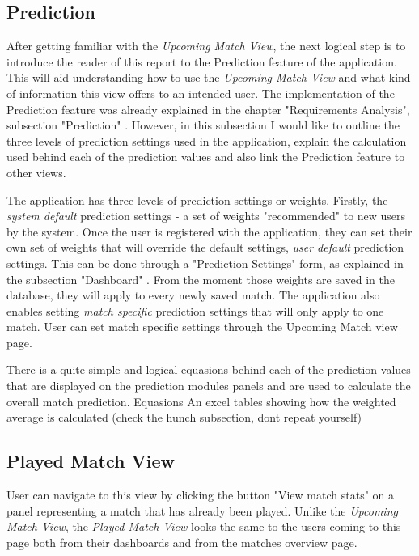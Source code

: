 \subsection{Prediction}
\label{subsec:predictionimplementation}
After getting familiar with the \emph{Upcoming Match View}, the next logical step is to introduce the reader of this report to the Prediction feature of the application. This will aid understanding how to use the \emph{Upcoming Match View} and what kind of information this view offers to an intended user. The implementation of the Prediction feature was already explained in the chapter "Requirements Analysis", subsection "Prediction" \cite{subsec:prediction_requirements}. However, in this subsection I would like to outline the three levels of prediction settings used in the application, explain the calculation used behind each of the prediction values and also link the Prediction feature to other views. 

The application has three levels of prediction settings or weights. Firstly, the \emph{system default} prediction settings - a set of weights "recommended" to new users by the system. Once the user is registered with the application, they can set their own set of weights that will override the default settings, \emph{user default} prediction settings. This can be done through a "Prediction Settings" form, as explained in the subsection "Dashboard" \cite{subsec:dashboard}. From the moment those weights are saved in the database, they will apply to every newly saved match. The application also enables setting \emph {match specific} prediction settings that will only apply to one match. User can set match specific settings through the Upcoming Match view page.

There is a quite simple and logical equasions behind each of the prediction values that are displayed on the prediction modules panels and are used to calculate the overall match prediction. 
Equasions
An excel tables showing how the weighted average is calculated (check the hunch subsection, dont repeat yourself)

\subsection{Played Match View}
\label{subsec:playedmatchview}
User can navigate to this view by clicking the button "View match stats" on a panel representing a match that has already been played. Unlike the \emph{Upcoming Match View}, the \emph{Played Match View} looks the same to the users coming to this page both from their dashboards and from the matches overview page. 

